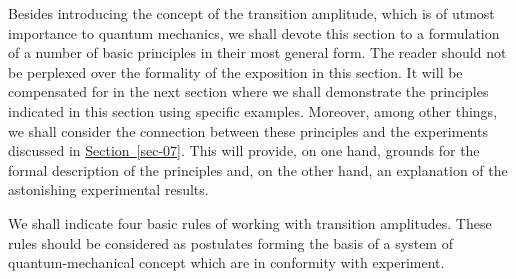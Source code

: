 \documentclass[a4paper,sfsidenotes,colorlinks=true]{tufte-book}
\numberwithin{equation}{section}
\numberwithin{figure}{section}
\begin{document}
Besides introducing the concept of the transition amplitude, which is
of utmost importance to quantum mechanics, we shall devote this
section to a formulation of a number of basic principles in their most
general form. The reader should not be perplexed over the formality of
the exposition in this section. It will be compensated for in the next
section where we shall demonstrate the principles indicated in this
section using specific examples. Moreover, among other things, we
shall consider the connection between these principles and the
experiments discussed in \hyperref[sec-07]{Section~\ref{sec-07}}. This
will provide, on one hand, grounds for the formal description of the
principles and, on the other hand, an explanation of the astonishing
experimental results.


We shall indicate four basic rules of working with transition amplitudes. These rules should be considered as postulates forming the basis of a system of quantum-mechanical concept which are in conformity with experiment.
\end{document}
